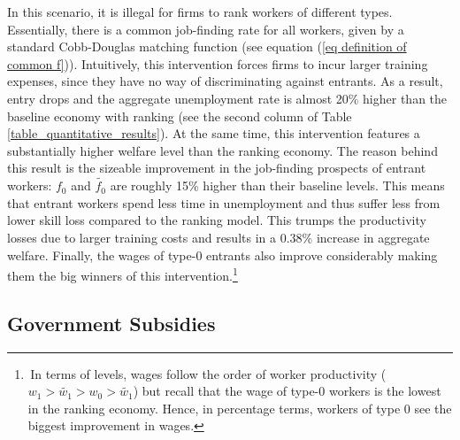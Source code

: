 \documentclass[12pt]{article} %
\theoremstyle{definition}
\begin{document}
In this scenario, it is illegal for firms to rank workers of different types.
Essentially, there is a common job-finding rate for all workers, given by a standard Cobb-Douglas matching function (see equation (\ref{eq definition of common f})).
Intuitively, this intervention forces firms to incur larger training expenses, since they have no way of discriminating against entrants. As a result, entry drops and the aggregate unemployment rate is almost 20\% higher than the baseline economy with ranking (see the second column of Table \ref{table_quantitative_results}).
At the same time, this intervention features a substantially higher welfare level than the ranking economy. 
The reason behind this result is the sizeable improvement in the job-finding prospects of entrant workers: $f_{0}$ and $\tilde{f_{0}}$ are roughly 15\% higher than their baseline levels.
This means that entrant workers spend less time in unemployment and thus suffer less from lower skill loss compared to the ranking model.
This trumps the productivity losses due to larger training costs and results in a 0.38\% increase in aggregate welfare.
Finally, the wages of type-0 entrants also improve considerably making them the big winners of this intervention.\footnote{\,In terms of levels, wages follow the order of worker productivity ($w_{1} > \tilde{w_{1}} > w_{0} > \tilde{w_{1}}$) but recall that the wage of type-0 workers is the lowest in the ranking economy. Hence, in percentage terms, workers of type 0 see the biggest improvement in wages.}


\subsection{Government Subsidies} \label{section government subsidies quant}
\end{document}
